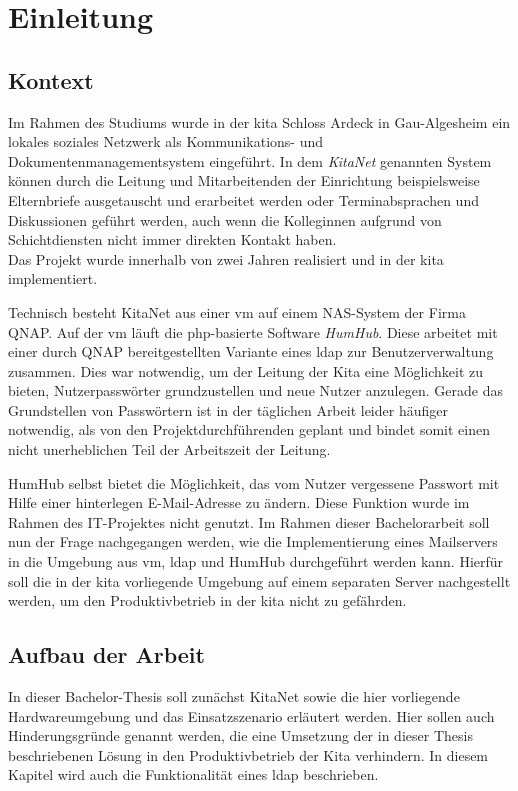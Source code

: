 

\chapter{Einleitung}
\label{sec:Einleitung}
\section{Kontext}
Im Rahmen des Studiums wurde in der \ac{kita} Schloss Ardeck in Gau-Algesheim ein lokales soziales Netzwerk als Kommunikations- und Dokumentenmanagementsystem eingeführt. In dem \textit{KitaNet} genannten System können durch die Leitung und Mitarbeitenden der Einrichtung beispielsweise Elternbriefe ausgetauscht und erarbeitet werden oder Terminabsprachen und Diskussionen geführt werden, auch wenn die Kolleginnen aufgrund von Schichtdiensten nicht immer direkten Kontakt haben. \\ Das Projekt wurde innerhalb von zwei Jahren realisiert und in der \ac{kita} implementiert.

Technisch besteht KitaNet aus einer \ac{vm} auf einem NAS-System der Firma QNAP. Auf der \ac{vm} läuft die php-basierte Software \textit{HumHub}. Diese arbeitet mit einer durch QNAP bereitgestellten Variante eines \ac{ldap} zur Benutzerverwaltung zusammen. Dies war notwendig, um der Leitung der Kita eine Möglichkeit zu bieten, Nutzerpasswörter grundzustellen und neue Nutzer anzulegen. Gerade das Grundstellen von Passwörtern ist in der täglichen Arbeit leider häufiger notwendig, als von den Projektdurchführenden geplant und bindet somit einen nicht unerheblichen Teil der Arbeitszeit der Leitung.

HumHub selbst bietet die Möglichkeit, das vom Nutzer vergessene Passwort mit Hilfe einer hinterlegen E-Mail-Adresse zu ändern. Diese Funktion wurde im Rahmen des IT-Projektes nicht genutzt. Im Rahmen dieser Bachelorarbeit soll nun der Frage nachgegangen werden, wie die Implementierung eines Mailservers in die Umgebung aus \ac{vm}, \ac{ldap} und HumHub durchgeführt werden kann. Hierfür soll die in der \ac{kita} vorliegende Umgebung auf einem separaten Server nachgestellt werden, um den Produktivbetrieb in der \ac{kita} nicht zu gefährden.

\section{Aufbau der Arbeit}

In dieser Bachelor-Thesis soll zunächst KitaNet sowie die hier vorliegende Hardwareumgebung und das Einsatzszenario erläutert werden. Hier sollen auch Hinderungsgründe genannt werden, die eine Umsetzung der in dieser Thesis beschriebenen Lösung in den Produktivbetrieb der Kita verhindern. In diesem Kapitel wird auch die Funktionalität eines \ac{ldap} beschrieben.

